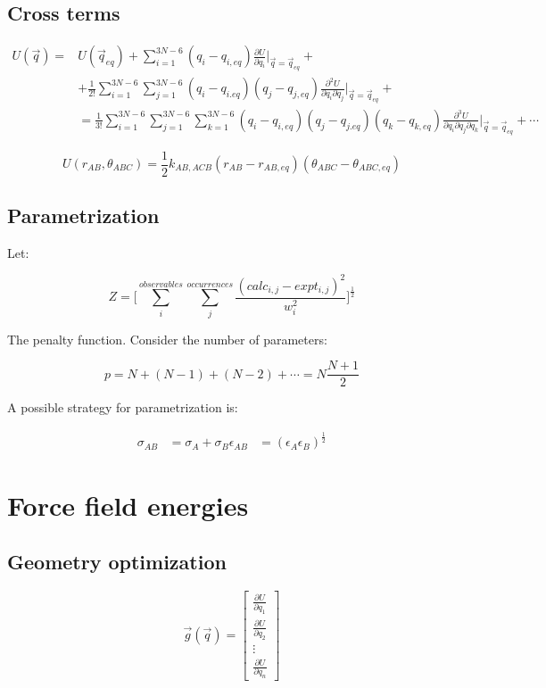 	\subsection{Cross terms}

	\begin{align*}
		U(\vec{q}) = &U(\vec{q}_{eq}) + \sum\limits_{i=1}^{3N-6}(q_i-q_{i,eq})\frac{\partial U}{\partial q_i}|_{\vec{q}=\vec{q}_{eq}} + \\
								 &+\frac{1}{2!}\sum\limits_{i=1}^{3N-6}\sum\limits_{j=1}^{3N-6}(q_i-q_{i.eq})(q_j-q_{j,eq})\frac{\partial^2 U}{\partial q_i\partial q_j}|_{\vec{q}=\vec{q}_{eq}} +\\
								 &=\frac{1}{3!}\sum\limits_{i=1}^{3N-6}\sum\limits_{j=1}^{3N-6}\sum\limits_{k=1}^{3N-6}(q_i-q_{i,eq})(q_j-q_{j.eq})(q_k-q_{k,eq})\frac{\partial^3 U}{\partial q_i\partial q_j\partial q_k}|_{\vec{q}=\vec{q}_{eq}} + \cdots
	\end{align*}

	$$U(r_{AB}, \theta_{ABC}) = \frac{1}{2}k_{AB,ACB}(r_{AB}-r_{AB, eq})(\theta_{ABC}-\theta_{ABC, eq})$$

	\subsection{Parametrization}
	Let:

	$$Z = \biggl[\sum\limits_{i}^{observables}\sum\limits_{j}^{occurrences}\frac{(calc_{i,j}-expt_{i,j})^2}{w_i^2}\biggr]^{\frac{1}{2}}$$

	The penalty function.
	Consider the number of parameters:

	$$p = N + (N-1)+(N-2)+\cdots = N\frac{N+1}{2}$$

	A possible strategy for parametrization is:

	\begin{align*}
		\sigma_{AB} &= \sigma_A+\sigma_B
		\epsilon_{AB} &= (\epsilon_A\epsilon_B)^{\frac{1}{2}}
	\end{align*}

\section{Force field energies}

	\subsection{Geometry optimization}

	$$\vec{g}(\vec{q}) = \begin{bmatrix} \frac{\partial U}{\partial q_1} \\ \frac{\partial U}{\partial q_2} \\ \vdots \\ \frac{\partial U}{\partial q_n}\end{bmatrix}$$

